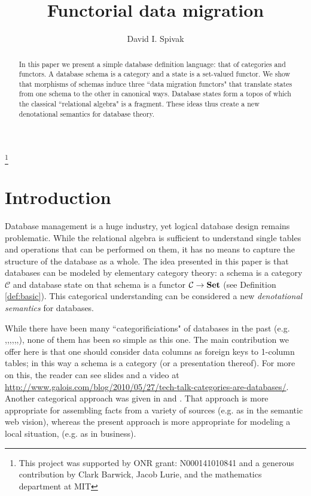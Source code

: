 \documentclass{amsart}
\def\mc{\mathcal}
\def\to{\rightarrow}
\def\Set{{\bf Set}}
\def\mcC{\mc{C}}
\theoremstyle{remark}
\theoremstyle{definition}
\begin{document}
\title{Functorial data migration}

\author{David I. Spivak}

\address{Department of Mathematics, Massachusetts Institute of Technology, Cambridge MA 02139}


\thanks{This project was supported by ONR grant: N000141010841 and a generous contribution by Clark Barwick, Jacob Lurie, and the mathematics department at MIT}

\begin{abstract}

In this paper we present a simple database definition language: that of categories and functors.  A database schema is a category and a state is a set-valued functor.  We show that morphisms of schemas induce three ``data migration functors" that translate states from one schema to the other in canonical ways.  Database states form a topos of which the classical ``relational algebra" is a fragment.  These ideas thus create a new denotational semantics for database theory.

\end{abstract}

\maketitle

\setcounter{tocdepth}{1}

\tableofcontents

\section{Introduction}

Database management is a huge industry, yet logical database design remains problematic.  While the relational algebra is sufficient to understand single tables and operations that can be performed on them, it has no means to capture the structure of the database as a whole.  The idea presented in this paper is that databases can be modeled by elementary category theory: a schema is a category $\mcC$ and database state on that schema is a functor $\mcC\to\Set$ (see Definition \ref{def:basic}).  This categorical understanding can be considered a new {\em denotational semantics} for databases.  

While there have been many ``categorificiations" of databases in the past (e.g. \cite{RW},\cite{JRW},\cite{PS},\cite{Ber},\cite{DK},\cite{Dis},\cite{GB}), none of them has been so simple as this one.   The main contribution we offer here is that one should consider data columns as foreign keys to 1-column tables; in this way a schema is a category (or a presentation thereof).  For more on this, the reader can see slides and a video at \href{http://www.galois.com/blog/2010/05/27/tech-talk-categories-are-databases/}{http://www.galois.com/blog/2010/05/27/tech-talk-categories-are-databases/}.  Another categorical approach was given in \cite{S1} and \cite{S2}.  That approach is more appropriate for assembling facts from a variety of sources (e.g. as in the semantic web vision), whereas the present approach is more appropriate for modeling a local situation, (e.g. as in business).
\end{document}
